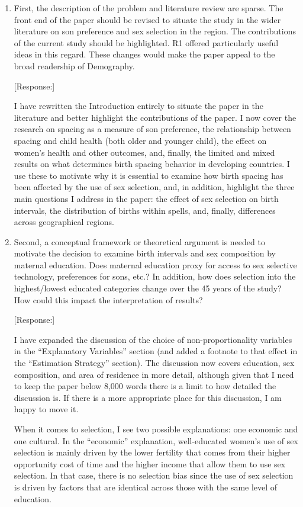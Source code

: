 \documentclass[letterpaper,12pt]{article}
\begin{document}
\begin{enumerate}

\item First, the description of the problem and literature review are sparse.
The front end of the paper should be revised to situate the study in the
wider literature on son preference and sex selection in the region. The
contributions of the current study should be highlighted. R1 offered
particularly useful ideas in this regard. These changes would make the
paper appeal to the broad readership of Demography.

[Response:]

I have rewritten the Introduction entirely to situate the paper in the literature 
and better highlight the contributions of the paper.
I now cover the research on spacing as a measure of son preference, the 
relationship between spacing and child health (both older and younger child), the 
effect on women's health and other outcomes, and, finally, the limited and mixed results
on what determines birth spacing behavior in developing countries.
I use these to motivate why it is essential to examine how birth spacing has been affected 
by the use of sex selection, and, in addition, highlight the three main questions I address 
in the paper: the effect of sex selection on birth intervals, the distribution of births 
within spells, and, finally, differences across geographical regions.


\item Second, a conceptual framework or theoretical argument is needed to
motivate the decision to examine birth intervals and sex composition by
maternal education. Does maternal education proxy for access to sex
selective technology, preferences for sons, etc.? 
In addition, how does
selection into the highest/lowest educated categories change over the 45
years of the study? How could this impact the interpretation of results?

[Response:]

I have expanded the discussion of the choice of non-proportionality variables in the 
``Explanatory Variables'' section (and added a footnote to that effect in the ``Estimation 
Strategy'' section).
The discussion now covers education, sex composition, and area of residence in more detail,
although given that I need to keep the paper below 8,000 words there is a limit to how
detailed the discussion is.
If there is a more appropriate place for this discussion, I am happy to move it.

When it comes to selection, I see two possible explanations: one economic and one 
cultural.
In the ``economic'' explanation, well-educated women's use of sex selection is mainly 
driven by the lower fertility that comes from their higher opportunity cost of time and 
the higher income that allow them to use sex selection.
In that case, there is no selection bias since the use of sex selection is driven by 
factors that are identical across those with the same level of education.


\end{enumerate}
\end{document}
